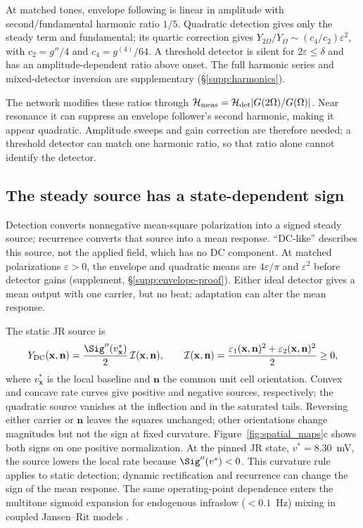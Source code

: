 At matched tones, envelope following is linear in amplitude with
second/fundamental harmonic ratio $1/5$. Quadratic detection gives only
the steady term and fundamental; its quartic correction gives
$Y_{2\Omega}/Y_\Omega\sim(c_4/c_2)\varepsilon^2$, with
$c_2=g''/4$ and $c_4=g^{(4)}/64$. A threshold detector is silent for
$2\varepsilon\le\delta$ and has an amplitude-dependent ratio above onset.
The full harmonic series and mixed-detector inversion are supplementary
(\S\ref{supp:harmonics}).
\ifjne\else

\fi

The network modifies these ratios through
$\mathcal H_{\rm meas}=\mathcal H_{\rm det}|G(2\Omega)/G(\Omega)|$.
Near resonance it can suppress an envelope follower's second harmonic,
making it appear quadratic. Amplitude sweeps and gain correction are
therefore needed; a threshold detector can match one harmonic ratio, so that
ratio alone cannot identify the detector.

\subsection{The steady source has a state-dependent sign}\label{sec:dc}
Detection converts nonnegative mean-square polarization into a signed steady
source; recurrence converts that source into a mean response. ``DC-like''
describes this source, not the applied field, which has no DC component.
At matched polarizations $\varepsilon>0$,
the envelope and quadratic means are $4\varepsilon/\pi$ and
$\varepsilon^2$ before detector gains (supplement, \S\ref{supp:envelope-proof}). Either ideal detector gives a mean
output with one carrier, but no beat; adaptation can alter the mean response.

The static JR source is
\[
Y_{\rm DC}(\mathbf x,\mathbf n)
=\frac{\Sig''(v^*_{\mathbf x})}{2}\,\mathcal I(\mathbf x,\mathbf n),
\qquad
\mathcal I(\mathbf x,\mathbf n)
=\frac{\varepsilon_1(\mathbf x,\mathbf n)^2+
\varepsilon_2(\mathbf x,\mathbf n)^2}{2}\ge0,
\]
where $v^*_{\mathbf x}$ is the local baseline and $\mathbf n$ the common
unit cell orientation. Convex and concave rate curves give positive and
negative sources, respectively; the quadratic source vanishes at the inflection
and in the saturated tails.
Reversing either carrier or $\mathbf n$ leaves the squares unchanged;
other orientations change magnitudes but not the sign at fixed curvature.
Figure~\ref{fig:spatial_maps}c shows both signs on one positive normalization.
At the pinned JR state, $v^*=8.30$~mV, the source lowers the local rate
because $\Sig''(v^*)<0$.
This curvature rule applies to static detection; dynamic rectification and
recurrence can change the sign of the mean response.
The same operating-point dependence enters the multitone sigmoid expansion for
endogenous infraslow ($<0.1$~Hz) mixing in coupled Jansen--Rit models \cite{Just2026mixing}.

